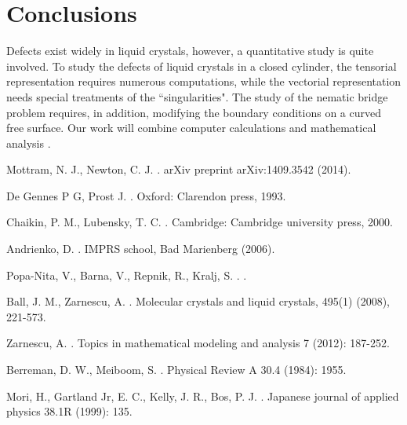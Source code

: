 \documentclass[nottitlepage]{article}
\begin{document}
\section{Conclusions}
Defects exist widely in liquid crystals, however, a quantitative study is quite involved. To study the defects of liquid crystals in a closed cylinder, the tensorial representation requires numerous computations, while the vectorial representation needs special treatments of the ``singularities". The study of the nematic bridge problem requires, in addition, modifying the boundary conditions on a curved free surface. Our work will combine computer calculations and mathematical analysis .




\begin{thebibliography}{99}


Mottram, N. J., Newton, C. J.
.
\newblock arXiv preprint arXiv:1409.3542 (2014).

De Gennes P G, Prost J.
.
\newblock Oxford: Clarendon press, 1993.

Chaikin, P. M., Lubensky, T. C.
.
\newblock Cambridge: Cambridge university press, 2000.

Andrienko, D.
.
\newblock IMPRS school, Bad Marienberg (2006).

Popa-Nita, V., Barna, V., Repnik, R., Kralj, S.
.
.


Ball, J. M., Zarnescu, A.
.
\newblock Molecular crystals and liquid crystals, 495(1) (2008), 221-573.



Zarnescu, A.
.
\newblock Topics in mathematical modeling and analysis 7 (2012): 187-252.

Berreman, D. W., Meiboom, S.
.
\newblock Physical Review A 30.4 (1984): 1955.

Mori, H., Gartland Jr, E. C., Kelly, J. R., Bos, P. J.
.
\newblock Japanese journal of applied physics 38.1R (1999): 135.




\end{thebibliography}
\end{document}
